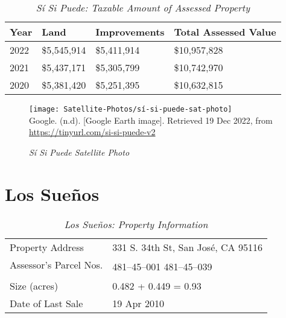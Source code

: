 \begin{table}[htb]
  \SingleSpacing%
  \caption[Sí Si Puede: Taxable Amount of Assessed Propery]{\textit{Sí Si Puede: Taxable Amount of Assessed Property}}\label{tab:sí-si-puede-taxable-amount}
  \begin{tabular}{llll}
    \toprule
    Year & Land        & Improvements & Total Assessed Value \\
    \midrule
    2022 & \$5,545,914 & \$5,411,914  & \$10,957,828 \\
    2021 & \$5,437,171 & \$5,305,799  & \$10,742,970 \\
    2020 & \$5,381,420 & \$5,251,395  & \$10,632,815 \\
    \bottomrule
  \end{tabular}
\end{table}

\begin{figure}[hbt]
  \centering
  \caption[Sí Si Puede Satellite Photo]{\textit{Sí Si Puede Satellite Photo}}\label{fig:sí-si-puede-sat-photo}
  \texttt{[image: Satellite-Photos/sí-si-puede-sat-photo]}\\ %
  \footnotesize
  Google. (n.d). [Google Earth image]. Retrieved 19 Dec 2022, from \url{https://tinyurl.com/si-si-puede-v2} %
\end{figure}


\clearpage
\section{Los Sueños}\label{sec:los-suenos-info}
\begin{table}[htb]
  \SingleSpacing%
  \caption[Los Sueños: Property Information]{\textit{Los Sueños: Property Information}}\label{tab:los-sueños-prop-info}
  \begin{tabular}{ll}
    \toprule
    Property Address       & 331 S. 34th St, San José, CA 95116 \\
    Assessor's Parcel Nos. & \multirow[t]{2}{1in}{481–45–001 481–45–039} \\
    \\
    Size (acres)           & 0.482 + 0.449 = 0.93 \\
    Date of Last Sale      & 19 Apr 2010 \\
    \bottomrule
  \end{tabular}
\end{table}

